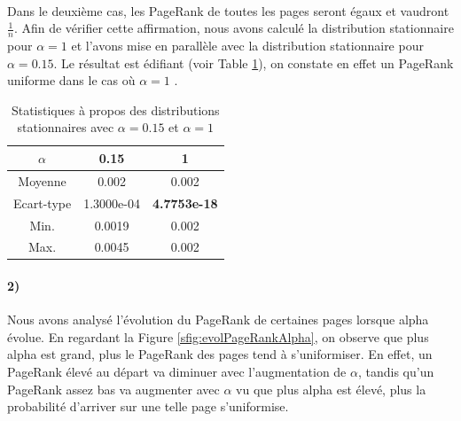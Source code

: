 \documentclass[a4paper,titlepage]{report}
\begin{document}
\paragraph{}
Dans le deuxième cas, les PageRank de toutes les pages seront égaux et vaudront $\frac{1}{n}$. Afin de vérifier cette affirmation, nous avons calculé la distribution stationnaire pour $\alpha = 1$ et l'avons mise en parallèle avec la distribution stationnaire pour $\alpha = 0.15$. Le résultat est édifiant (voir Table \ref{tab:alpha_comp}), on constate en effet un PageRank uniforme dans le cas où $\alpha = 1$ .
\begin{table}[h]
	\center
	\begin{tabular}{|c|c|c|}
		\hline 
		$\alpha$   & 0.15  & 1 \\
		\hline
	 	Moyenne    & 0.002 & 0.002\\
	 	Ecart-type & 1.3000e-04 & \textbf{4.7753e-18} \\
	 	Min.       & 0.0019 & 0.002\\
	 	Max.       & 0.0045 & 0.002\\
	 	\hline
	\end{tabular}
	\caption{Statistiques à propos des distributions stationnaires avec $\alpha = 0.15$ et $\alpha = 1$}
	\label{tab:alpha_comp}
\end{table}
\paragraph{2)}
Nous avons analysé l'évolution du PageRank de certaines pages lorsque alpha évolue. En regardant la Figure \ref{sfig:evolPageRankAlpha}, on observe que plus alpha est grand, plus le PageRank des pages tend à s'uniformiser. En effet, un PageRank élevé au départ va diminuer avec l'augmentation de $\alpha$, tandis qu'un PageRank assez bas va augmenter avec $\alpha$ vu que plus alpha est élevé, plus la probabilité d'arriver sur une telle page s'uniformise.   
\end{document}
